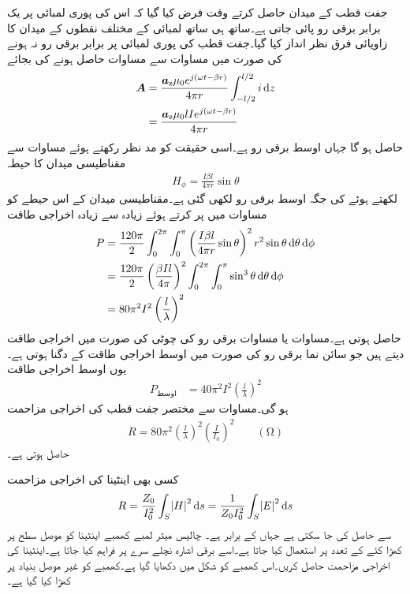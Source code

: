 جفت قطب کے میدان حاصل کرتے وقت فرض کیا گیا کہ اس کی پوری لمبائی پر یک برابر برقی رو  پائی جاتی ہے۔ساتھ ہی ساتھ لمبائی  کے مختلف نقطوں کے میدان کا زاویائی فرق نظر انداز کیا گیا۔جفت قطب کی پوری لمبائی پر برابر برقی رو نہ ہونے  کی صورت میں مساوات  سے مساوات  حاصل ہونے کی بجائے
\begin{align*}
\kvec{A} &=\frac{\az \mu_0  e^{j(\omega t -\beta r)}}{4\pi r}\int_{-l/2}^{l/2} i \dif z \\
&=\frac{\az \mu_0 l I e^{j(\omega t -\beta r)}}{4\pi r}
\end{align*}
حاصل ہو گا جہاں  اوسط برقی رو ہے۔اسی حقیقت کو مد نظر رکھتے ہوئے مساوات  سے مقناطیسی میدان کا حیطہ
\begin{align}
H_{\phi}=\frac{I \beta l}{4\pi r} \sin \theta 
\end{align}
لکھتے ہوئے  کی جگہ اوسط برقی رو  لکھی گئی ہے۔مقناطیسی میدان کے اس حیطے  کو مساوات  میں پر کرتے ہوئے زیادہ سے زیادہ اخراجی طاقت 
 \begin{align*}
P&=\frac{120\pi}{2 }\int_0^{2\pi}\int_0^{\pi} \left(\frac{I \beta l}{4\pi r} \sin \theta \right)^2  r^2 \sin \theta \dif \theta \dif \phi\\
&=\frac{120\pi}{2 }\left(\frac{\beta I l}{4\pi}\right)^2\int_0^{2\pi}\int_0^{\pi}  \sin^3 \theta \dif \theta \dif \phi\\
&=80 \pi^2 I^2\left(\frac{l}{\lambda}\right)^2
\end{align*} 
حاصل ہوتی ہے۔مساوات  یا مساوات  برقی رو کی چوٹی  کی صورت میں اخراجی  طاقت دیتے ہیں جو سائن نما برقی رو کی صورت میں اوسط اخراجی طاقت کے دگنا ہوتی ہے۔یوں اوسط اخراجی طاقت
\begin{align}
P_{\text{اوسط}}  &= 40 \pi^2 I^2\left(\frac{l}{\lambda}\right)^2
\end{align} 
ہو گی۔مساوات  سے مختصر جفت قطب کی اخراجی مزاحمت 
\begin{align}\label{مساوات_اینٹینا_اخراجی_مزاحمت_جفت_قطب}
R=80 \pi^2 \left(\frac{l}{\lambda}\right)^2  \left(\frac{I}{I_0} \right)^2\quad \quad (\si{\ohm})
\end{align}
حاصل ہوتی ہے۔

کسی بھی اینٹینا کی اخراجی مزاحمت
\begin{align}
R=\frac{Z_0}{I_0^2} \int_S \abs{H}^2 \dif s=\frac{1}{Z_0 I_0^2} \int_S \abs{E}^2 \dif s
\end{align}
سے حاصل کی جا سکتی ہے جہاں  کے برابر ہے۔
چالیس میٹر لمبے کھمبے اینٹینا کو موصل سطح پر کھڑا کئے   کے تعدد پر استعمال کیا جاتا ہے۔اسے برقی اشارہ نچلے سرے پر فراہم کیا جاتا ہے۔اینٹینا کی اخراجی مزاحمت حاصل کریں۔اس کھمبے کو شکل  میں دکھایا گیا ہے۔کھمبے کو غیر موصل بنیاد پر کھڑا کیا گیا ہے۔

